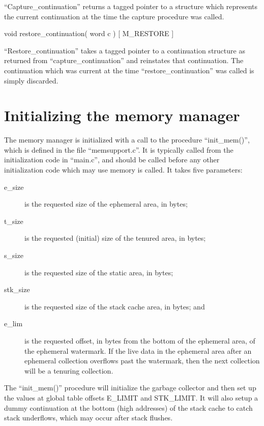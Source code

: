 \begin{description}
``Capture\_continuation'' returns a tagged pointer to a structure which
represents the current continuation at the time the capture procedure was
called.

\item { void restore\_continuation( word c ) \hfill [ M\_RESTORE ] }

``Restore\_continuation'' takes a tagged pointer to a continuation structure
as returned from ``capture\_continuation'' and reinstates that continuation.
The continuation which was current at the time ``restore\_continuation'' was
called is simply discarded.

\end{description}

\section{Initializing the memory manager}

The memory manager is initialized with a call to the procedure ``init\_mem()'',
which is defined in the file ``memsupport.c''. It is typically called from
the initialization code in ``main.c'', and should be called before any other
initialization code which may use memory is called. It takes five parameters:

\begin{description}
\item[e\_size] is the requested size of the ephemeral area, in bytes;
\item[t\_size] is the requested (initial) size of the tenured area, in bytes;
\item[s\_size] is the requested size of the static area, in bytes;
\item[stk\_size] is the requested size of the stack cache area, in bytes; and
\item[e\_lim] is the requested offset, in bytes from the bottom of the
  ephemeral area, of the ephemeral watermark. If the live data in the
  ephemeral area after an ephemeral collection overflows past the
  watermark, then the next collection will be a tenuring collection.
\end{description}

The ``init\_mem()'' procedure will initialize the garbage collector and then
set up the values at global table offsets E\_LIMIT and STK\_LIMIT. It will
also setup a dummy continuation at the bottom (high addresses) of the
stack cache to catch stack underflows, which may occur after stack flushes.


